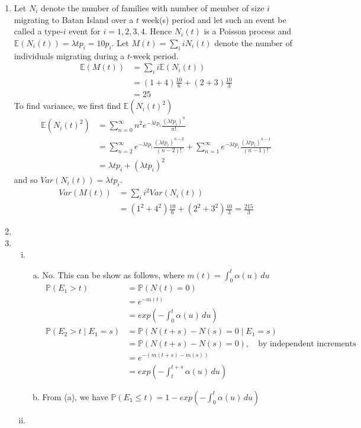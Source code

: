 \documentclass[a4paper,10pt]{article}
\theoremstyle{definition}
\begin{document}
\begin{enumerate}
\item Let $N_i$ denote the number of families with number of member of size $i$ migrating to Batan Island over a $t$ week(s) period and let such an event be called a type-$i$ event for $i=1,2,3,4$. Hence $N_i(t)$ is a Poisson process and $\mathbb{E}(N_i(t))=\lambda t p_i=10p_i$. Let $M(t)=\sum_{i}iN_i(t)$ denote the number of individuals migrating during a $t$-week period. 
\begin{align*}
\mathbb{E}(M(t))&=\sum_{i}i\mathbb{E}(N_i(t))\\
&=(1+4)\frac{10}{6}+(2+3)\frac{10}{3}\\
&=25
\end{align*}
To find variance, we first find $\mathbb{E}(N_i(t)^2)$
\begin{align*}
\mathbb{E}(N_i(t)^2)&=\sum_{n=0}^{\infty}n^2e^{-\lambda t p_i}\frac{(\lambda t p_i)^n}{n!}\\
&=\sum_{n=2}^{\infty}e^{-\lambda t p_i}\frac{(\lambda t p_i)^{n-2}}{(n-2)!}+\sum_{n=1}^{\infty}e^{-\lambda t p_i}\frac{(\lambda t p_i)^{n-1}}{(n-1)!}\\
&=\lambda t p_i+(\lambda t p_i)^2
\end{align*}
and so $Var(N_i(t))=\lambda t p_i$.
\begin{align*}
Var(M(t))&=\sum_{i}i^2Var(N_i(t))\\
&=(1^2+4^2)\frac{10}{6}+(2^2+3^2)\frac{10}{3}=\frac{215}{3}
\end{align*}

\item

\item
\begin{enumerate}[(i)]
\item
\begin{enumerate}[(a)]
\item No. This can be show as follows, where $m(t)=\int_{0}^{t}\alpha(u)\,du$
\begin{align*}
\mathbb{P}(E_1>t)&=\mathbb{P}(N(t)=0)\\
&=e^{-m(t)}\\
&=exp\left(-\int_{0}^{t}\alpha(u)\,du\right)\\
\mathbb{P}(E_2>t\mid E_1=s)&=\mathbb{P}(N(t+s)-N(s)=0\mid E_1=s)\\
&=\mathbb{P}(N(t+s)-N(s)=0),\quad \text{by independent increments}\\
&=e^{-(m(t+s)-m(s))}\\
&=exp\left(-\int_{t}^{t+s}\alpha(u)\,du\right)
\end{align*}
\item From (a), we have $\mathbb{P}(E_1\leq t)=1-exp\left(-\int_{0}^{t}\alpha(u)\,du\right)$
\end{enumerate}
\item
\end{enumerate}


\end{enumerate}
\end{document}
